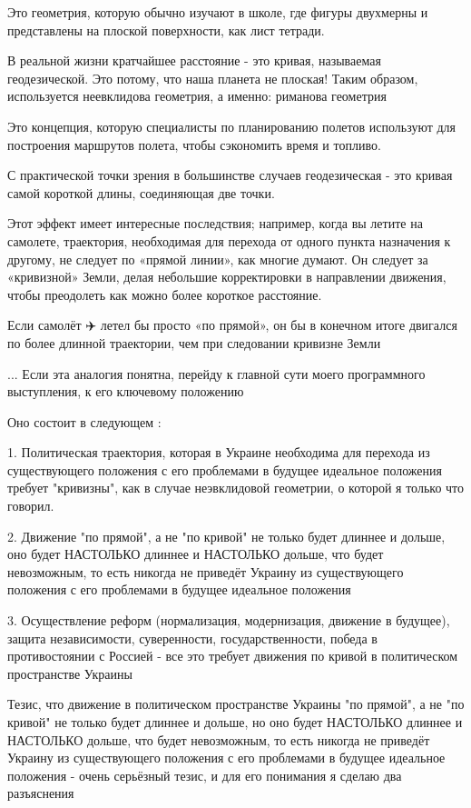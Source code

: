 Это геометрия, которую обычно изучают в школе, где фигуры двухмерны и
представлены на плоской поверхности, как лист тетради.

В реальной жизни кратчайшее расстояние - это кривая, называемая геодезической.
Это потому, что наша планета не плоская! Таким образом, используется
неевклидова геометрия, а именно: риманова геометрия

Это концепция, которую специалисты по планированию полетов используют для
построения маршрутов полета, чтобы сэкономить время и топливо.

С практической точки зрения в большинстве случаев геодезическая - это кривая
самой короткой длины, соединяющая две точки.

Этот эффект имеет интересные последствия; например, когда вы летите на
самолете, траектория, необходимая для перехода от одного пункта назначения к
другому, не следует по «прямой линии», как многие думают. Он следует за
«кривизной» Земли, делая небольшие корректировки в направлении движения, чтобы
преодолеть как можно более короткое расстояние.

Если самолёт  ✈️  летел бы просто «по прямой», он бы в конечном итоге двигался
по более длинной траектории, чем при следовании кривизне Земли

... Если эта аналогия понятна, перейду к главной сути моего программного выступления, к его ключевому положению

Оно состоит в следующем :

1. Политическая траектория, которая в Украине необходима для перехода из
существующего положения с его проблемами в будущее идеальное положения требует
"кривизны", как в случае неэвклидовой геометрии, о которой я только что
говорил.

2. Движение "по прямой", а не "по кривой" не только будет длиннее и дольше, оно
будет НАСТОЛЬКО длиннее и НАСТОЛЬКО дольше, что будет невозможным, то есть
никогда не приведёт Украину из существующего положения с его проблемами в
будущее идеальное положения

3. Осуществление реформ (нормализация, модернизация, движение в будущее),
защита независимости, суверенности, государственности, победа в противостоянии
с Россией - все это требует движения по кривой в политическом пространстве
Украины

Тезис, что движение в политическом пространстве Украины "по прямой", а не "по
кривой" не только будет длиннее и дольше, но оно будет НАСТОЛЬКО длиннее и
НАСТОЛЬКО дольше, что будет невозможным, то есть никогда не приведёт Украину из
существующего положения с его проблемами в будущее идеальное положения - очень
серьёзный тезис, и для его понимания я сделаю два разъяснения

